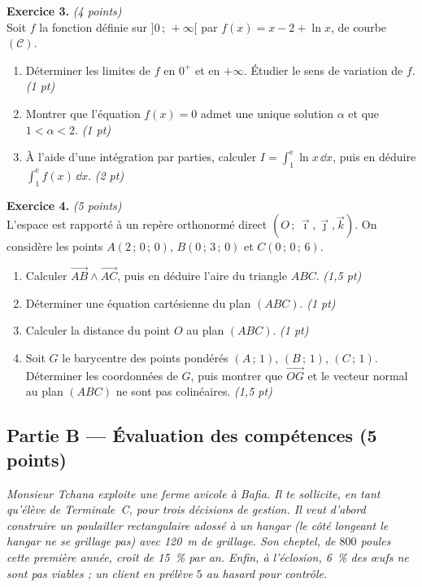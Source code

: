 \smallskip
\noindent\textbf{Exercice 3.} \hfill\textit{(4 points)}\\
Soit $f$ la fonction définie sur $]0\,;\,+\infty[$ par $f(x)=x-2+\ln x$, de courbe $(\mathcal{C})$.
\begin{enumerate}[label=\arabic*)]
\item Déterminer les limites de $f$ en $0^+$ et en $+\infty$. Étudier le sens de variation de $f$. \hfill\textit{(1 pt)}
\item Montrer que l'équation $f(x)=0$ admet une unique solution $\alpha$ et que $1<\alpha<2$. \hfill\textit{(1 pt)}
\item À l'aide d'une intégration par parties, calculer $\displaystyle I=\int_1^{\mathrm e}\ln x\,\dd x$,
puis en déduire $\displaystyle\int_1^{\mathrm e}f(x)\,\dd x$. \hfill\textit{(2 pt)}
\end{enumerate}

\smallskip
\noindent\textbf{Exercice 4.} \hfill\textit{(5 points)}\\
L'espace est rapporté à un repère orthonormé direct $(O\,;\,\vec\imath,\vec\jmath,\vec k)$.
On considère les points $A(2\,;\,0\,;\,0)$, $B(0\,;\,3\,;\,0)$ et $C(0\,;\,0\,;\,6)$.
\begin{enumerate}[label=\arabic*)]
\item Calculer $\vec{AB}\wedge\vec{AC}$, puis en déduire l'aire du triangle $ABC$. \hfill\textit{(1,5 pt)}
\item Déterminer une équation cartésienne du plan $(ABC)$. \hfill\textit{(1 pt)}
\item Calculer la distance du point $O$ au plan $(ABC)$. \hfill\textit{(1 pt)}
\item Soit $G$ le barycentre des points pondérés $(A\,;\,1)$, $(B\,;\,1)$, $(C\,;\,1)$.
Déterminer les coordonnées de $G$, puis montrer que $\vec{OG}$ et le vecteur normal au plan
$(ABC)$ ne sont pas colinéaires. \hfill\textit{(1,5 pt)}
\end{enumerate}

\subsection*{Partie B — Évaluation des compétences \hfill (5 points)}

\noindent\textit{Monsieur Tchana exploite une ferme avicole à Bafia. Il te sollicite, en tant
qu'élève de Terminale~C, pour trois décisions de gestion. Il veut d'abord construire un
poulailler rectangulaire \emph{adossé à un hangar} (le côté longeant le hangar ne se grillage
pas) avec \SI{120}{\metre} de grillage. Son cheptel, de $800$ poules cette première année,
croît de \SI{15}{\percent} par an. Enfin, à l'éclosion, \SI{6}{\percent} des œufs ne sont pas
viables ; un client en prélève $5$ au hasard pour contrôle.}

